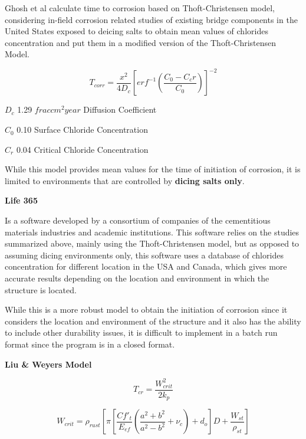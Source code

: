 Ghosh et al calculate time to corrosion based on Thoft-Christensen model, considering in-field corrosion related studies of existing bridge components in the United States exposed to deicing salts to obtain mean values of chlorides concentration and put them in a modified version of the Thoft-Christensen Model.

\begin{equation}
T_{corr}=\frac{x^2}{4 D_c} \left[erf^{-1} \left(\frac{C_0-C_cr}{C_0} \right) \right]^{-2}
  \label{eq.three}
\end{equation} 

$D_c$ 1.29 $frac{cm^2}{year}$ Diffusion Coefficient 

$C_0$ 0.10 Surface Chloride Concentration

$C_r$ 0.04 Critical Chloride Concentration
\newline

While this model provides mean values for the time of initiation of corrosion, it is limited to environments that are controlled by \textbf{dicing salts only}.
\newline

\textbf{Life 365}
\newline

Is a software developed by a consortium of companies of the cementitious materials industries and academic institutions. This software relies on the studies summarized above, mainly using the Thoft-Christensen model, but as opposed to assuming dicing environments only, this software uses a database of chlorides concentration for different location in the USA and Canada, which gives more accurate results depending on the location and environment in which the structure is located.

While this is a more robust model to obtain the initiation of corrosion since it considers the location and environment of the structure and it also has the ability to include other durability issues, it is difficult to implement in a batch run format since the program is in a closed format.
\newline

\textbf{Liu \& Weyers Model}
\newline

\begin{equation}
  T_{cr}=\frac{W_{crit}^2}{2k_p}
  \label{eq.four}
\end{equation} 

\begin{equation}
  W_{crit}=\rho_{rust} \left[ \pi \left[ \frac{C f'_t}{E_{ef}} \left( \frac{a^2+b^2}{a^2-b^2}+\nu_c \right)+d_o \right] D+ \frac{W_{st}}{\rho_{st}} \right]
  \label{eq.five}
\end{equation} 

